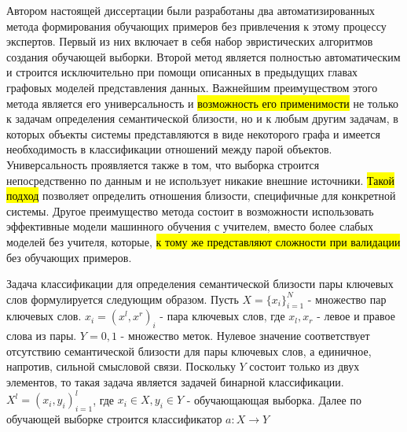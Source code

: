 Автором настоящей диссертации были разработаны два автоматизированных метода формирования обучающих примеров без привлечения к этому процессу экспертов. Первый из них включает в себя набор эвристических алгоритмов создания обучающей выборки. Второй метод является полностью автоматическим и строится исключительно при помощи описанных в предыдущих главах графовых моделей представления данных. Важнейшим преимуществом этого метода является его универсальность и \hl{возможность его применимости} не только к задачам определения семантической близости, но и к любым другим задачам, в которых объекты системы представляются в виде некоторого графа и имеется необходимость в классификации отношений между парой объектов. Универсальность проявляется также в том, что выборка строится непосредственно по данным и не использует никакие внешние источники. \hl{Такой подход} позволяет определить отношения близости, специфичные для конкретной системы. Другое преимущество метода состоит в возможности использовать эффективные модели машинного обучения с учителем, вместо более слабых моделей без учителя, которые, \hl{к тому же представляют сложности при валидации} без обучающих примеров.

Задача классификации для определения семантической близости пары ключевых слов формулируется следующим образом. Пусть $X=\{x_i\}_{i=1}^N$ - множество пар ключевых слов. $x_i=(x^l,x^r)_i$ - пара ключевых слов, где $x_l,x_r$ - левое и правое слова из пары. $Y={0,1}$ - множество меток. Нулевое значение соответствует отсутствию семантической близости для пары ключевых слов, а единичное, напротив, сильной смысловой связи. Поскольку $Y$ состоит только из двух элементов, то такая задача является задачей бинарной классификации. $X^l=(x_i,y_i)_{i=1}^l$, где $x_i \in X, y_i \in Y$ - обучающающая выборка. Далее по обучающей выборке строится классификатор $a: X\rightarrow Y$

